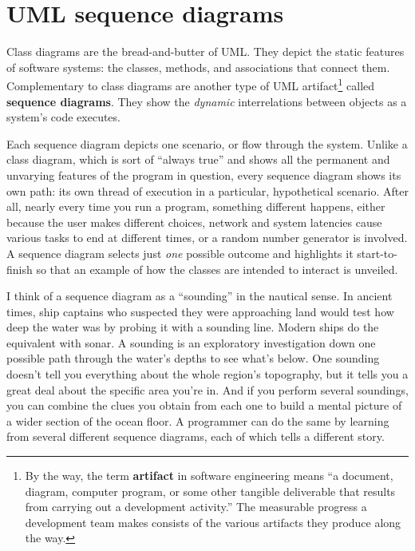 
\chapter{UML sequence diagrams}
\label{artifact}

Class diagrams are the bread-and-butter of UML. They depict the static
features of software systems: the classes, methods, and associations that
connect them. Complementary to class diagrams are another type of UML
artifact\footnote{By the way, the term \textbf{artifact} in software
engineering means ``a document, diagram, computer program, or some other
tangible deliverable that results from carrying out a development activity.''
The measurable progress a development team makes consists of the various
artifacts they produce along the way.} called \textbf{sequence diagrams}. They
show the \textit{dynamic} interrelations between objects as a system's code
executes.

Each sequence diagram depicts one scenario, or flow through the system. Unlike
a class diagram, which is sort of ``always true'' and shows all the permanent
and unvarying features of the program in question, every sequence diagram
shows its own path: its own thread of execution in a particular, hypothetical
scenario. After all, nearly every time you run a program, something different
happens, either because the user makes different choices, network and system
latencies cause various tasks to end at different times, or a random number
generator is involved. A sequence diagram selects just \textit{one} possible
outcome and highlights it start-to-finish so that an example of how the
classes are intended to interact is unveiled.

I think of a sequence diagram as a ``sounding'' in the nautical sense. In
ancient times, ship captains who suspected they were approaching land would
test how deep the water was by probing it with a sounding line. Modern ships
do the equivalent with sonar. A sounding is an exploratory investigation down
one possible path through the water's depths to see what's below. One sounding
doesn't tell you everything about the whole region's topography, but it tells
you a great deal about the specific area you're in. And if you perform several
soundings, you can combine the clues you obtain from each one to build a
mental picture of a wider section of the ocean floor. A programmer can do the
same by learning from several different sequence diagrams, each of which
tells a different story.

